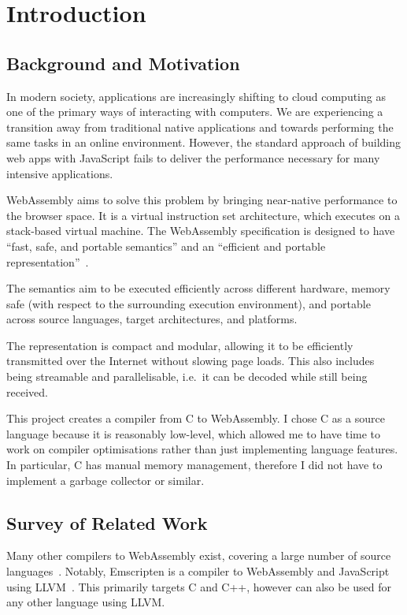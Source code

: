 \documentclass[00-main.tex]{subfiles}
\begin{document}
\chapter{Introduction}

\section{Background and Motivation}

In modern society, applications are increasingly shifting to cloud computing as one of the primary ways of interacting with computers.
We are experiencing a transition away from traditional native applications and towards performing the same tasks in an online environment.
However, the standard approach of building web apps with JavaScript fails to deliver the performance necessary for many intensive applications.

WebAssembly aims to solve this problem by bringing near-native performance to the browser space.
It is a virtual instruction set architecture, which executes on a stack-based virtual machine.
The WebAssembly specification is designed to have ``fast, safe, and portable semantics'' and an ``efficient and portable representation''~.

The semantics aim to be executed efficiently across different hardware, memory safe (with respect to the surrounding execution environment), and portable across source languages, target architectures, and platforms.

The representation is compact and modular, allowing it to be efficiently transmitted over the Internet without slowing page loads.
This also includes being streamable and parallelisable, i.e.~it can be decoded while still being received.

This project creates a compiler from C to WebAssembly.
I chose C as a source language because it is reasonably low-level, which allowed me to have time to work on compiler optimisations rather than just implementing language features.
In particular, C has manual memory management, therefore I did not have to implement a garbage collector or similar.


\section{Survey of Related Work}

Many other compilers to WebAssembly exist, covering a large number of source languages~.
Notably, Emscripten is a compiler to WebAssembly and JavaScript using LLVM~.
This primarily targets C and C++, however can also be used for any other language using LLVM\@.
\end{document}
